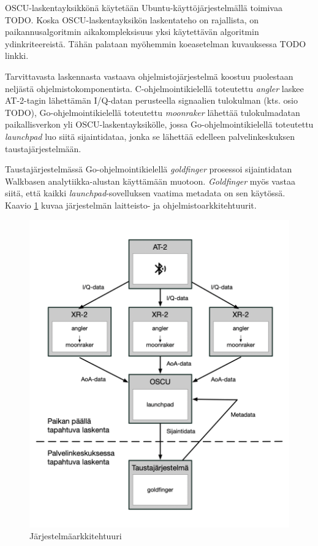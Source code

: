 \documentclass[
  12pt,
  a4paper, twoside]{book}
\begin{document}
OSCU-laskentayksikkönä käytetään Ubuntu-käyttöjärjestelmällä toimivaa TODO. Koska OSCU-laskentayksikön laskentateho on rajallista, on paikannusalgoritmin aikakompleksisuus yksi käytettävän algoritmin ydinkriteereistä. Tähän palataan myöhemmin koeasetelman kuvauksessa TODO linkki.

Tarvittavasta laskennasta vastaava ohjelmistojärjestelmä koostuu puolestaan neljästä ohjelmistokomponentista. C-ohjelmointikielellä toteutettu \emph{angler} laskee AT-2-tagin lähettämän I/Q-datan perusteella signaalien tulokulman (kts. osio TODO), Go-ohjelmointikielellä toteutettu \emph{moonraker} lähettää tulokulmadatan paikallisverkon yli OSCU-laskentayksikölle, jossa Go-ohjelmointikielellä toteutettu \emph{launchpad} luo siitä sijaintidataa, jonka se lähettää edelleen palvelinkeskuksen taustajärjestelmään.

Taustajärjestelmässä Go-ohjelmointikielellä \emph{goldfinger} prosessoi sijaintidatan Walkbasen analytiikka-alustan käyttämään muotoon. \emph{Goldfinger} myös vastaa siitä, että kaikki \emph{launchpad}-sovelluksen vaatima metadata on sen käytössä. Kaavio \ref{fig:jarjestelmaarkkitehtuuri} kuvaa järjestelmän laitteisto- ja ohjelmistoarkkitehtuurit.

\begin{figure}[H]
\centering
\includegraphics[width=15cm]{jarjestelmaarkkitehtuuri}
\caption{Järjestelmäarkkitehtuuri}
\label{fig:jarjestelmaarkkitehtuuri}
\end{figure}
\end{document}
